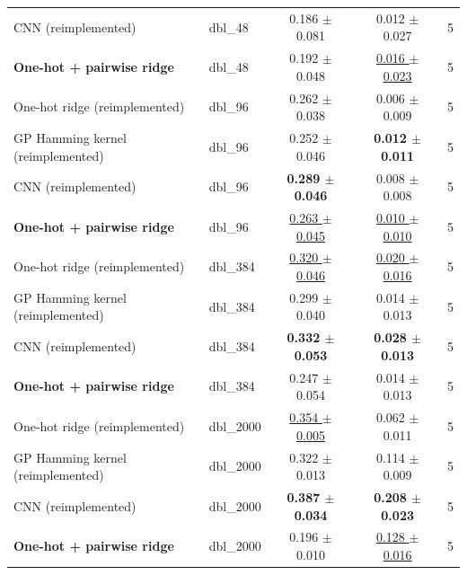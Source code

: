 \begin{tabular}{llccc}
CNN (reimplemented) & dbl\_48 & 0.186 $\pm$ 0.081 & 0.012 $\pm$ 0.027 & 5 \\
\textbf{One-hot + pairwise ridge} & dbl\_48 & 0.192 $\pm$ 0.048 & \underline{0.016 $\pm$ 0.023} & 5 \\
\midrule
One-hot ridge (reimplemented) & dbl\_96 & 0.262 $\pm$ 0.038 & 0.006 $\pm$ 0.009 & 5 \\
GP Hamming kernel (reimplemented) & dbl\_96 & 0.252 $\pm$ 0.046 & \textbf{0.012 $\pm$ 0.011} & 5 \\
CNN (reimplemented) & dbl\_96 & \textbf{0.289 $\pm$ 0.046} & 0.008 $\pm$ 0.008 & 5 \\
\textbf{One-hot + pairwise ridge} & dbl\_96 & \underline{0.263 $\pm$ 0.045} & \underline{0.010 $\pm$ 0.010} & 5 \\
\midrule
One-hot ridge (reimplemented) & dbl\_384 & \underline{0.320 $\pm$ 0.046} & \underline{0.020 $\pm$ 0.016} & 5 \\
GP Hamming kernel (reimplemented) & dbl\_384 & 0.299 $\pm$ 0.040 & 0.014 $\pm$ 0.013 & 5 \\
CNN (reimplemented) & dbl\_384 & \textbf{0.332 $\pm$ 0.053} & \textbf{0.028 $\pm$ 0.013} & 5 \\
\textbf{One-hot + pairwise ridge} & dbl\_384 & 0.247 $\pm$ 0.054 & 0.014 $\pm$ 0.013 & 5 \\
\midrule
One-hot ridge (reimplemented) & dbl\_2000 & \underline{0.354 $\pm$ 0.005} & 0.062 $\pm$ 0.011 & 5 \\
GP Hamming kernel (reimplemented) & dbl\_2000 & 0.322 $\pm$ 0.013 & 0.114 $\pm$ 0.009 & 5 \\
CNN (reimplemented) & dbl\_2000 & \textbf{0.387 $\pm$ 0.034} & \textbf{0.208 $\pm$ 0.023} & 5 \\
\textbf{One-hot + pairwise ridge} & dbl\_2000 & 0.196 $\pm$ 0.010 & \underline{0.128 $\pm$ 0.016} & 5 \\
\bottomrule
\end{tabular}
